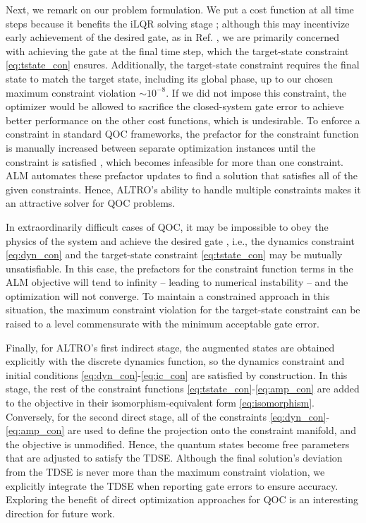 \documentclass[
  amsfonts,
  amsmath,
  amssymb,
  pra,
  twocolumn,
  superscriptaddress,
]{revtex4-2}
\begin{document}
Next, we remark on our problem formulation.
We put a cost function at all time steps
because it benefits the iLQR solving stage \cite{Jackson2020altroc};
although this may incentivize early achievement of the desired gate,
as in Ref. \cite{leung2017speedup}, we are primarily concerned
with achieving the gate at the final time step, which the target-state
constraint \eqref{eq:tstate_con} ensures.
Additionally, the target-state constraint
requires the final state to match the target state, including its global phase,
up to our chosen maximum constraint violation $\sim 10^{-8}$.
If we did not impose this constraint, the optimizer would be
allowed to sacrifice the closed-system gate error to achieve better
performance on the other cost functions, which is undesirable.
To enforce a constraint in standard QOC frameworks,
the prefactor for the constraint function is manually increased
between separate optimization instances until the constraint is satisfied
\cite{heeres2017implementing, leung2017speedup, reinhold2019controlling},
which becomes infeasible for more than one constraint.
ALM automates these prefactor updates to find
a solution that satisfies all of the given constraints.
Hence, ALTRO's ability to handle multiple constraints makes it
an attractive solver for QOC problems.

In extraordinarily difficult cases of
QOC, it may be impossible
to obey the physics of the system and achieve the desired gate \cite{abdelhafez2020universal},
i.e., the dynamics constraint \eqref{eq:dyn_con}
and the target-state constraint \eqref{eq:tstate_con} may be mutually unsatisfiable.
In this case, the prefactors for the constraint function terms
in the ALM objective will tend to infinity -- leading to numerical instability -- and the
optimization will not converge. To maintain a constrained approach in this situation,
the maximum constraint violation for the target-state constraint can be raised
to a level commensurate with the minimum acceptable gate error.

Finally, for ALTRO's first indirect stage,
the augmented states are obtained explicitly with the discrete
dynamics function, so the dynamics constraint and initial conditions
\eqref{eq:dyn_con}-\eqref{eq:ic_con} are satisfied by construction.
In this stage, the rest of the constraint functions \eqref{eq:tstate_con}-\eqref{eq:amp_con}
are added to the objective in their isomorphism-equivalent form \eqref{eq:isomorphism}.
Conversely, for the second direct stage, all of the constraints
\eqref{eq:dyn_con}-\eqref{eq:amp_con} are used to define
the projection onto the constraint manifold, and the objective is unmodified.
Hence, the quantum states become
free parameters that are adjusted to satisfy the TDSE.
Although the final solution's deviation from the TDSE is never
more than the maximum constraint violation,
we explicitly integrate the TDSE when reporting gate errors to ensure accuracy.
Exploring the benefit of direct optimization approaches
for QOC is an interesting direction for future work.
\end{document}
